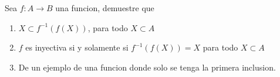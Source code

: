\documentclass[../main.tex]{subfiles}
\begin{document}
\begin{problem}
  Sea $f: A \to B$ una funcion, demuestre que
  \begin{enumerate}
    \item $X \subset f^{-1}(f(X))$, para todo $X \subset A$
    \item $f$ es inyectiva si y solamente si $f^{-1}(f(X)) = X$ para todo $X \subset A$
    \item De un ejemplo de una funcion donde solo se tenga la primera inclusion.
  \end{enumerate}
\end{problem}
%
%
%
\end{document}
